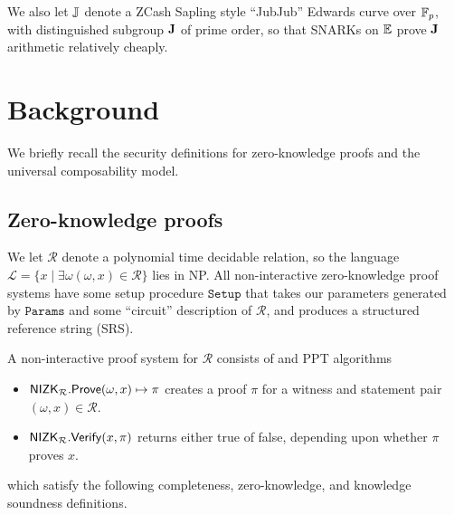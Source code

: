 We also let ${\mathbb{J}}$ denote a ZCash Sapling style ``JubJub'' Edwards curve
over $\mathbb{F}_p$, with distinguished subgroup ${\mathbf{J}}$ of prime order, so that
SNARKs on ${\mathbb{E}}$ prove ${\mathbf{J}}$ arithmetic relatively cheaply.



\section{Background}
\label{sec:background}

We briefly recall the security definitions for zero-knowledge proofs and the universal composability model.


\subsection{Zero-knowledge proofs}
\label{subsec:zkp_background}

\newcommand\rel{\ensuremath{\mathcal{R}}\xspace}
\newcommand\lang{\ensuremath{\mathcal{L}}\xspace}

% 

We let \rel denote a polynomial time decidable relation, so the language
$\lang = \{x \mid \exists \omega (\omega,x) \in \rel \}$ lies in NP.
All non-interactive zero-knowledge proof systems have some setup procedure $\mathtt{Setup}$ that takes our parameters generated by $\mathtt{Params}$ and some ``circuit'' description of \rel, and produces a structured reference string (SRS).

A non-interactive proof system for $\rel$ consists of \Prove and \Verify PPT algorithms
\begin{itemize}
\item $\NIZK_\rel.\Prove(\omega, x) \mapsto \pi$ creates a proof $\pi$ for a witness and statement pair $(\omega,x) \in \rel$.
\item $\NIZK_\rel.\Verify(x, \pi)$ returns either true of false, depending upon whether $\pi$  proves $x$.
\end{itemize}	
which satisfy the following completeness, zero-knowledge, and knowledge soundness definitions.

